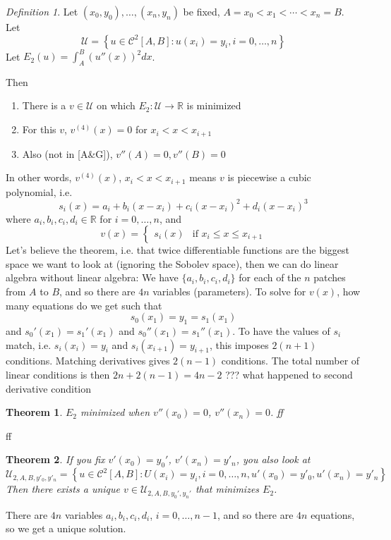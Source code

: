 \documentclass{article}
\theoremstyle{plain}
\newtheorem{theorem}{Theorem}
\theoremstyle{remark}
\newtheorem{definition}{Definition}
\newcommand{\R}{{\mathbb R}}
\begin{document}
\begin{definition}
	Let $(x_0,y_0),\dots,(x_n,y_n)$ be fixed, $A = x_0 < x_1 < \cdots < x_n = B$.
	Let
	\[
		\mathcal{U} = \left\{u \in \mathcal{C}^2[A,B] \colon
		u(x_i) = y_i, i = 0,\dots,n\right\}
	\]
	Let $E_2(u) = \int_A^B (u''(x))^2 dx$.
\end{definition}
Then
\begin{enumerate}
	\item There is a $v \in \mathcal{U}$ on which $E_2 \colon \mathcal{U} \to \R$ is minimized
	\item For this $v$, $v^{(4)}(x) = 0$ for $x_i < x < x_{i+1}$
	\item Also (not in [A\&G]),
		$v''(A) = 0, v''(B) = 0$
\end{enumerate}
In other words, $v^{(4)}(x)$, $x_i < x < x_{i+1}$ means $v$ is piecewise
a cubic polynomial, i.e.
\[
	s_i(x) = a_i + b_i(x-x_i) + c_i(x-x_i)^2 + d_i(x-x_i)^3
\]
where $a_i,b_i,c_i,d_i \in \R$ for $i = 0,\dots,n$, and
\[
	v(x) = \begin{cases} s_i(x) & \text{if }x_i \leq x \leq x_{i+1} \end{cases}
\]
Let's believe the theorem,
i.e. that twice differentiable functions are the biggest space we want to look at
(ignoring the Sobolev space),
then we can do linear algebra without linear algebra:
We have $\{a_i,b_i,c_i,d_i\}$ for each of the $n$ patches from $A$ to $B$,
and so there are $4n$ variables (parameters).
To solve for $v(x)$, how many equations do we get such that
\[
	s_0(x_1) = y_1 = s_1(x_1)
\]
and $s_0'(x_1) = s_1'(x_1)$ and $s_0''(x_1) = s_1''(x_1)$.
To have the values of $s_i$ match, i.e. $s_i(x_i) = y_i$ and $s_i(x_{i+1}) = y_{i+1}$,
this imposes $2(n+1)$ conditions.
Matching derivatives gives $2(n-1)$ conditions.
The total number of linear conditions is then
$2n + 2(n-1) = 4n-2$ ??? what happened to second derivative condition

\begin{theorem}
	$E_2$ minimized when $v''(x_0) = 0$, $v''(x_n) = 0$.
	ff
\end{theorem}
ff

\begin{theorem}
	If you fix $v'(x_0) = y_0'$, $v'(x_n) = y'_n$, you also look at
	\[
		\mathcal{U}_{2,A,B,y'_0,y'_n}
		= \left\{u \in \mathcal{C}^2[A,B] \colon
		U(x_i) = y_i, i = 0,\dots,n, u'(x_0) = y'_0, u'(x_n) = y'_n\right\}
	\]
	Then there exists a unique $v \in \mathcal{U}_{2,A,B,y_0', y_n'}$
	that minimizes $E_2$.
\end{theorem}
There are $4n$ variables $a_i,b_i,c_i,d_i$, $i = 0,\dots,n-1$,
and so there are $4n$ equations, so we get a unique solution.
\end{document}

